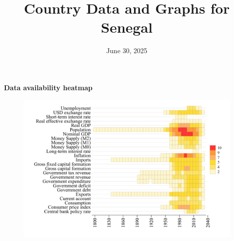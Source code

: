 \documentclass[12pt,a4paper,landscape]{article}
\begin{document}
\title{\Large Country Data and Graphs for Senegal}
\date{June 30, 2025}
\maketitle
\thispagestyle{empty}

\clearpage
\setcounter{page}{1}
\hypersetup{colorlinks=true,linkcolor=blue,linktoc=all}
\label{toc}
\tableofcontents
\thispagestyle{empty}
\clearpage
{}
{}
\begin{center}
{\Large\bfseries Data availability heatmap}
\end{center}
\vspace{1cm}
\begin{figure}[H]
\centering
\includegraphics[width=\textwidth,height=0.8\textheight,keepaspectratio]{graphs/SEN_heatmap.pdf}
\end{figure}
\setcounter{page}{3}
\end{document}
